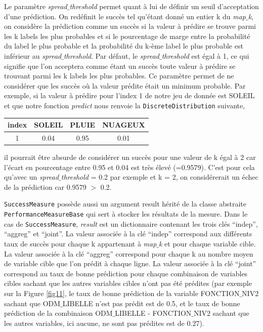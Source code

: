 Le paramètre \textit{spread$\_$threshold} permet quant à lui de définir un seuil d’acceptation d’une prédiction. On redéfinit le succès tel qu’étant donné un entier k du \textit{map$\_$k}, on considère la prédiction comme un succès si la valeur à prédire se trouve parmi les k labels les plus probables et si le pourcentage de marge entre la probabilité du label le plus probable et la probabilité du k-ème label le plus probable est inférieur au \textit{spread$\_$threshold}. Par défaut, le \textit{spread$\_$threshold} est égal à 1, ce qui signifie que l’on acceptera comme étant un succès toute valeur à prédire se trouvant parmi les k labels les plus probables. Ce paramètre permet de ne considérer que les succès où la valeur prédite était un minimum probable. Par exemple, si la valeur à prédire pour l’index 1 de notre jeu de donnée est SOLEIL et que notre fonction \textit{predict} nous renvoie la \texttt{DiscreteDistribution} suivante,

\begin{center}
\begin{tabular}{cccc}
\rowcolor[RGB]{200, 200, 200}index & SOLEIL & PLUIE & NUAGEUX \\
\hline
1 & 0.04 & 0.95 & 0.01

\end{tabular}
\end{center}

il pourrait être absurde de considérer un succès pour une valeur de k égal à 2 car l’écart en pourcentage entre 0.95 et 0.04 est très élevé (=0.9579). C’est pour cela qu’avec un \textit{spread$\_$threshold} = 0.2 par exemple et k = 2, on considérerait un échec de la prédiction car 0.9579 $>$ 0.2.

\texttt{SuccessMeasure} possède aussi un argument result hérité de la classe abstraite \texttt{PerformanceMeasureBase} qui sert à stocker les résultats de la mesure. Dans le cas de \texttt{SuccessMeasure}, \textit{result} est un dictionnaire contenant les trois clés “indep”, “aggreg” et “joint”.
La valeur associée à la clé “indep” correspond aux différents taux de succès pour chaque k appartenant à \textit{map$\_$k} et pour chaque variable cible.
La valeur associée à la clé “aggreg” correspond pour chaque k au nombre moyen de variable cible que l’on prédit à chaque ligne.
La valeur associée à la clé “joint” correspond au taux de bonne prédiction pour chaque combinaison de variables cibles sachant que les autres variables cibles n’ont pas été prédites (par exemple sur la Figure \ref{fig11}, le taux de bonne prédiction de la variable FONCTION$\_$NIV2 sachant que ODM$\_$LIBELLE n’est pas prédit est de 0.5, et le taux de bonne prédiction de la combinaison ODM$\_$LIBELLE - FONCTION$\_$NIV2 sachant que les autres variables, ici aucune, ne sont pas prédites est de 0.27).

